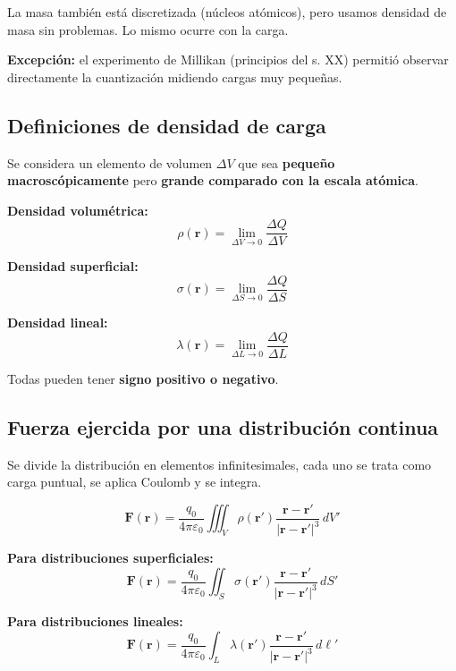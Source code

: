 \documentclass[12pt,a4paper]{article}
\begin{document}
\begin{notebox}[Analogía]
  La masa también está discretizada (núcleos atómicos), pero usamos
  densidad de masa sin problemas. Lo mismo ocurre con la carga.
\end{notebox}

\textbf{Excepción:} el experimento de Millikan (principios del s. XX)
permitió observar directamente la cuantización midiendo cargas muy
pequeñas.

\subsection{Definiciones de densidad de carga}

Se considera un elemento de volumen $\Delta V$ que sea
\textbf{pequeño macroscópicamente} pero \textbf{grande comparado con la
escala atómica}.

\textbf{Densidad volumétrica:}
\[
\rho(\mathbf{r}) = \lim_{\Delta V \to 0} \frac{\Delta Q}{\Delta V}
\]

\textbf{Densidad superficial:}
\[
\sigma(\mathbf{r}) = \lim_{\Delta S \to 0} \frac{\Delta Q}{\Delta S}
\]

\textbf{Densidad lineal:}
\[
\lambda(\mathbf{r}) = \lim_{\Delta L \to 0} \frac{\Delta Q}{\Delta L}
\]

Todas pueden tener \textbf{signo positivo o negativo}.

\subsection{Fuerza ejercida por una distribución continua}

Se divide la distribución en elementos infinitesimales, cada uno se
trata como carga puntual, se aplica Coulomb y se integra.

\begin{keybox}
  \[
  \boxed{
  \mathbf{F}(\mathbf{r}) =
  \frac{q_0}{4\pi\varepsilon_0}
  \iiint_V \rho(\mathbf{r}')
  \frac{\mathbf{r} - \mathbf{r}'}
       {|\mathbf{r} - \mathbf{r}'|^{3}}
  \,dV'
  }
  \]
\end{keybox}

\textbf{Para distribuciones superficiales:}
\[
\mathbf{F}(\mathbf{r}) = \frac{q_0}{4\pi\varepsilon_0}
\iint_S \sigma(\mathbf{r}')
\frac{\mathbf{r} - \mathbf{r}'}{|\mathbf{r} - \mathbf{r}'|^{3}}
\,dS'
\]

\textbf{Para distribuciones lineales:}
\[
\mathbf{F}(\mathbf{r}) = \frac{q_0}{4\pi\varepsilon_0}
\int_L \lambda(\mathbf{r}')
\frac{\mathbf{r} - \mathbf{r}'}{|\mathbf{r} - \mathbf{r}'|^{3}}
\,d\ell'
\]
\end{document}
